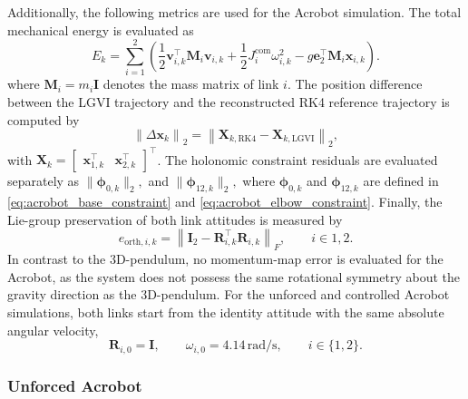 Additionally, the following metrics are used for the Acrobot simulation. 
The total mechanical energy is evaluated as
\[
E_k
=
\sum_{i=1}^{2}
\left(
    \frac{1}{2}\bm{v}_{i,k}^{\top}\bm{M}_i\bm{v}_{i,k}
    +
    \frac{1}{2}J_i^{\mathrm{com}}\omega_{i,k}^{2}
    -
    g \bm{e}_2^{\top}\bm{M}_i\bm{x}_{i,k}
\right).
\]
where $\bm{M}_i = m_i \bm{I}$ denotes the mass matrix of link $i$. The position difference between the LGVI trajectory and the reconstructed RK4 reference trajectory is computed by
\[
\left\|\Delta \bm{x}_k\right\|_2
=
\left\|
\bm{X}_{k,\mathrm{RK4}}
-
\bm{X}_{k,\mathrm{LGVI}}
\right\|_2,
\]
with $\bm{X}_k =
\begin{bmatrix}
\bm{x}_{1,k}^{\top} & \bm{x}_{2,k}^{\top}
\end{bmatrix}^{\top}$. The holonomic constraint residuals are evaluated separately as
$
\|\bm{\phi}_{0,k}\|_2,$
and
$\|\bm{\phi}_{12,k}\|_2,
$
where $\bm{\phi}_{0,k}$ and $\bm{\phi}_{12,k}$ are defined in \eqref{eq:acrobot_base_constraint} and \eqref{eq:acrobot_elbow_constraint}. Finally, the Lie-group preservation of both link attitudes is measured by
\[
e_{\mathrm{orth},i,k}
=
\left\|
\bm{I}_2 - \bm{R}_{i,k}^{\top}\bm{R}_{i,k}
\right\|_F,
\qquad
i\in{1,2}.
\]
In contrast to the 3D-pendulum, no momentum-map error is evaluated for the Acrobot, as the system does not possess the same rotational symmetry about the gravity direction as the 3D-pendulum.
For the unforced and controlled Acrobot simulations, both links start from the
identity attitude with the same absolute angular velocity,
\[
\bm{R}_{i,0}=\bm{I},
\qquad
\omega_{i,0}=4.14\,\si{\radian\per\second},
\qquad i\in\{1,2\}.
\]

\subsubsection{Unforced Acrobot}

